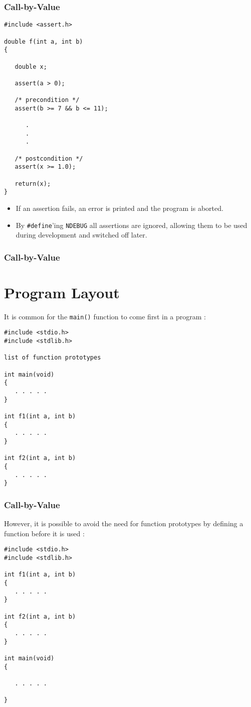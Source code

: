 \begin{frame}[fragile]
\frametitle{Call-by-Value}
\begin{verbatim}
#include <assert.h>

double f(int a, int b)
{

   double x;

   assert(a > 0);

   /* precondition */
   assert(b >= 7 && b <= 11);

      .
      .
      .

   /* postcondition */
   assert(x >= 1.0);

   return(x);
}
\end{verbatim}
\end{frame}

\begin{itemize}
\item If an assertion fails, an error is printed and the
program is aborted.
\item By \verb^#define^'ing \verb^NDEBUG^ all assertions are
ignored, allowing them to be used during development and switched
off later.
\end{itemize}

\begin{frame}[fragile]
\frametitle{Call-by-Value}
\section*{Program Layout}
{\samepage
It is common for the \verb^main()^ function to come
first in a program :
\begin{verbatim}
#include <stdio.h>
#include <stdlib.h>

list of function prototypes

int main(void)
{
   . . . . .
}

int f1(int a, int b)
{
   . . . . .
}

int f2(int a, int b)
{
   . . . . .
}
\end{verbatim}
}
\end{frame}

\begin{frame}[fragile]
\frametitle{Call-by-Value}
However, it is possible to avoid the need for function prototypes
by defining a function before it is used :

\begin{verbatim}
#include <stdio.h>
#include <stdlib.h>

int f1(int a, int b)
{
   . . . . .
}

int f2(int a, int b)
{
   . . . . .
}

int main(void)
{

   . . . . .

}
\end{verbatim}
\end{frame}

